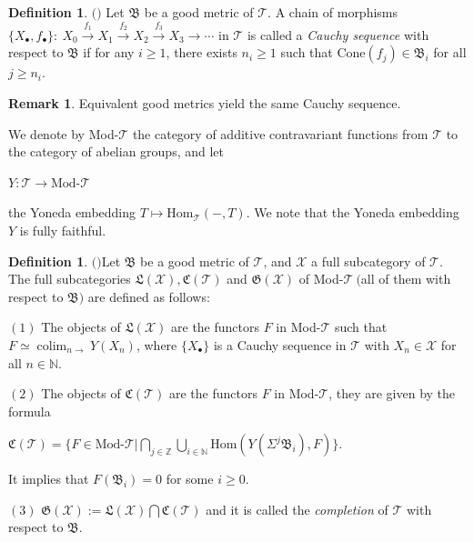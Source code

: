 \documentclass[11pt,a4paper]{amsart}
\numberwithin{equation}{section} \theoremstyle{plain}
\numberwithin{equation}{section} \theoremstyle{definition}
\newtheorem{definition}[lem]{Definition}
\newtheorem{rem}[lem]{Remark}
\newenvironment{rmk}{\begin{rem}\rm}{\end{rem}}
\newenvironment{df}{\begin{definition}\rm}{\end{definition}}
\begin{document}
\begin{df}$($\cite[Definition 1.6]{N1}$)$ Let $\mathfrak{B}$ be a good metric of $\mathcal{T}$. A chain of morphisms $\{X_{\bullet},f_{\bullet}\}:~X_{0}\xrightarrow{f_{1}}X_{1}\xrightarrow{f_{2}}X_{2}\xrightarrow{f_{3}}X_{3}\xrightarrow{}\cdots$ in $\mathcal{T}$ is called a \emph{Cauchy sequence} with respect to $\mathfrak{B}$ if for any $i\geq1$, there exists $n_{i}\geq1$ such that $\mathrm{Cone}(f_{j})\in\mathfrak{B}_{i}$ for all $j\geq n_{i}$.
\end{df}


\begin{rmk} Equivalent good metrics yield the same Cauchy sequence.
\end{rmk}


We denote by Mod-$\mathcal{T}$ the category of additive contravariant functions from $\mathcal{T}$ to the category of abelian groups, and let
\begin{center}
$Y:\mathcal{T}\rightarrow \text{Mod-}\mathcal{T}$
\end{center}the Yoneda embedding $T\mapsto\mathrm{Hom}_{\mathcal{T}}(-,T)$. We note that the Yoneda embedding $Y$ is fully faithful.


\begin{df}$($\cite[Definition 1.10]{N1}$)$\label{dfn1} Let $\mathfrak{B}$ be a good metric of $\mathcal{T}$, and $\mathcal{X}$ a full subcategory of $\mathcal{T}$. The full subcategories $\mathfrak{L}(\mathcal{X}),\mathfrak{C}(\mathcal{T})$ and $\mathfrak{G}(\mathcal{X})$ of Mod-$\mathcal{T}~($all of them with respect to $\mathfrak{B})$ are defined as follows:

$(1)$ The objects of  $\mathfrak{L}(\mathcal{X})$ are the functors $F$ in Mod-$\mathcal{T}$ such that $F\simeq \displaystyle\operatorname*{colim}_{n\to} Y(X_{n})$, where $\{X_{\bullet}\}$ is a Cauchy sequence in $\mathcal{T}$ with $X_{n}\in\mathcal{X}$ for all $n\in\mathbb{N}$.

$(2)$ The objects of  $\mathfrak{C}(\mathcal{T})$ are the functors $F$ in Mod-$\mathcal{T}$, they are given by the formula
\begin{center}
$\mathfrak{C}(\mathcal{T})=
\{F\in\text{Mod-}\mathcal{T}|\bigcap\limits_{j\in\mathbb{Z}}\bigcup\limits_{i\in\mathbb{N}}\mathrm{Hom}(Y(\Sigma^{j}\mathfrak{B}_{i}),F)\}$.
\end{center}
It implies that $F(\mathfrak{B}_{i})=0$ for some $i\geq0$.

$(3)$ $\mathfrak{G}(\mathcal{X}):=\mathfrak{L}(\mathcal{X})\bigcap\mathfrak{C}(\mathcal{T})$ and it is called the \emph{completion} of $\mathcal{T}$ with respect to $\mathfrak{B}$.
\end{df}
\end{document}
